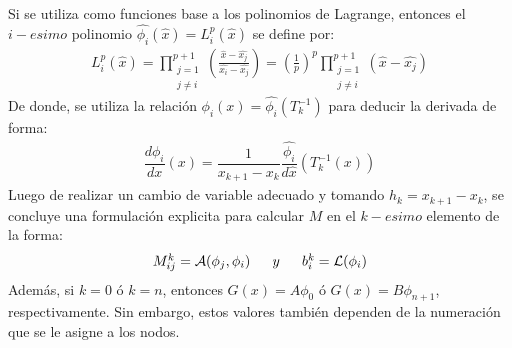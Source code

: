 \documentclass[12pt]{article}
\begin{document}
Si se utiliza como funciones base a los polinomios de Lagrange, entonces el $i-esimo$ polinomio $\hat{\phi_i}(\hat{x}) = L^p_i(\hat{x})$ se define por:
\begin{equation*}
\begin{array}{c}
L^p_i(\hat{x}) 
=\prod_{\substack{j=1\\j\ne i}}^{p+1}
\left(\frac{\hat{x}-\hat{x_j}}{\hat{x_i}-\hat{x_j}}\right)
=(\frac{1}{p})^{p}\prod_{\substack{j=1\\j\ne i}}^{p+1}
(\hat{x}-\hat{x_j})
\end{array}
\end{equation*}
De donde, se utiliza la relación  $\phi_i(x)= \hat{\phi_i}(T^{-1}_k)$ para deducir la derivada de forma:
\begin{equation*}
\begin{array}{c}
\dfrac{d\phi_i}{dx}(x) = \dfrac{1}{x_{k+1}-x_k}\dfrac{\hat{\phi_i}}{d\hat{x}}(T^{-1}_k(x))
\end{array}
\end{equation*}
Luego de realizar un cambio de variable adecuado y tomando $h_k=x_{k+1}-x_k$, se concluye una formulación explicita para calcular $M$ en el $k-esimo$ elemento de la forma:
\begin{equation*}
\begin{array}{l}
\LARGE{M}_{ij}^k = \mathcal{A}(\phi_j,\phi_i) \quad y \quad b_{i}^k = \mathcal{L}(\phi_i)
\end{array}
\end{equation*}
Además, si $k=0$ ó $k=n$, entonces $G(x)= A\phi_0$ ó $G(x)= B\phi_{n+1}$, respectivamente. Sin embargo, estos valores también dependen de la numeración que se le asigne a los nodos.\\


\end{document}
